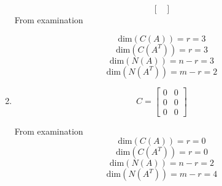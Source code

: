 \begin{enumerate}[label=(\alph*)]
\begin{equation}
\begin{bmatrix}
            \end{bmatrix}
        \end{equation}
            From examination
            \begin{mdframed}[style=MyFrame]
                \begin{equation}
                    \text{dim}(C(A)) = r = 3
                \end{equation}
                \begin{equation}
                    \text{dim}(C(A^{T})) = r = 3
                \end{equation}
                \begin{equation}
                    \text{dim}(N(A)) = n-r = 3 
                \end{equation}
                \begin{equation}
                    \text{dim}(N(A^{T})) = m-r = 2 
                \end{equation}
            \end{mdframed}
    \item 
        \begin{equation}
            C = 
            \begin{bmatrix}
                0   &   0   \\
                0   &   0   \\
                0   &   0
                
            \end{bmatrix}
        \end{equation}
        \begin{mdframed}[style=MyFrame]
            From examination
                \begin{equation}
                    \text{dim}(C(A)) = r = 0
                \end{equation}
                \begin{equation}
                    \text{dim}(C(A^{T})) = r = 0
                \end{equation}
                \begin{equation}
                    \text{dim}(N(A)) = n-r = 2 
                \end{equation}
                \begin{equation}
                    \text{dim}(N(A^{T})) = m-r = 4 
                \end{equation}
        \end{mdframed}
\end{enumerate}
